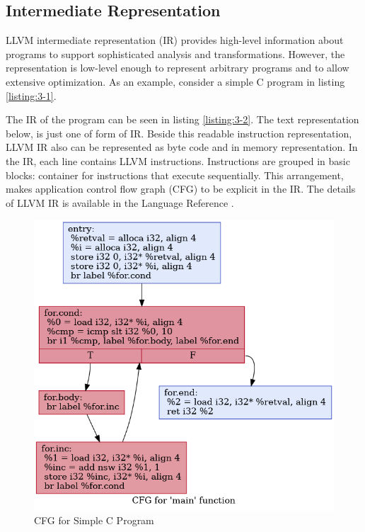 \subsection{Intermediate Representation}

LLVM intermediate representation (IR) provides high-level information about programs to support sophisticated analysis and transformations. However, the representation is low-level enough to represent arbitrary programs and to allow extensive optimization. As an example, consider a simple C program in listing \ref{listing:3-1}.


The IR of the program can be seen in listing \ref{listing:3-2}. The text representation below, is just one of form of IR. Beside this readable instruction representation, LLVM IR also can be represented as byte code and in memory representation. In the IR, each line contains LLVM instructions. Instructions are grouped in basic blocks: container for instructions that execute sequentially. This arrangement, makes application control flow graph (CFG) to be explicit in the IR. The details of LLVM IR is available in the Language Reference \cite{LLVMLanguageReferencea}.



\begin{figure}[htbp]
\centerline{\includegraphics[scale=.5]{Figures/cfg.png}}
\caption{CFG for Simple C Program}
\label{fig:2-1}
\end{figure}


